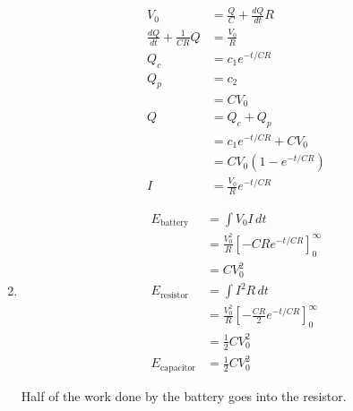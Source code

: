 \documentclass{article}
\begin{document}
\begin{enumerate}
        \begin{align*}
          V_0                               & = \frac{Q}{C} + \frac{d Q}{d t} R \\
          \frac{d Q}{d t} + \frac{1}{C R} Q & = \frac{V_0}{R}                   \\
          Q_c                               & = c_1 e^{-t / C R}                \\
          Q_p                               & = c_2                             \\
                                            & = C V_0                           \\
          Q                                 & = Q_c + Q_p                       \\
                                            & = c_1 e^{-t / C R} + C V_0        \\
                                            & = C V_0 (1 - e^{-t / C R})        \\
          I                                 & = \frac{V_0}{R} e^{-t / C R}
        \end{align*}

  \item

        \begin{align*}
          E_\text{battery}   & = \int V_0 I \,d t                                                    \\
                             & = \frac{V_0^2}{R} \left[ -C R e^{-t / C R} \right]_0^\infty           \\
                             & = C V_0^2                                                             \\
          E_\text{resistor}  & = \int I^2 R \,d t                                                    \\
                             & = \frac{V_0^2}{R} \left[ -\frac{C R}{2} e^{-t / C R} \right]_0^\infty \\
                             & = \frac{1}{2} C V_0^2                                                 \\
          E_\text{capacitor} & = \frac{1}{2} C V_0^2
        \end{align*}

        Half of the work done by the battery goes into the resistor.
\end{enumerate}

\subsection{}
\end{document}
